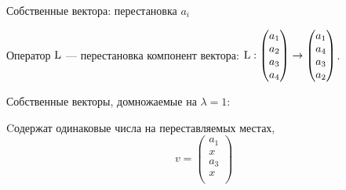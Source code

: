 \begin{frame}{Собственные вектора: перестановка $a_i$}

Оператор $\operatorname{L}$ — перестановка компонент вектора:
$\operatorname{L} : \begin{pmatrix}
    a_1 \\
    a_2 \\
    a_3\\
    a_4 \\
\end{pmatrix} \to 
\begin{pmatrix}
    a_1 \\
    a_4 \\
    a_3\\
    a_2 \\
\end{pmatrix}$.
\pause

Собственные векторы, домножаемые на $\lambda = 1$:

Cодержат одинаковые числа на переставляемых местах,
\[
v=\begin{pmatrix}
    a_1 \\
    x \\
    a_3 \\
    x \\
\end{pmatrix}
\]

\end{frame}



